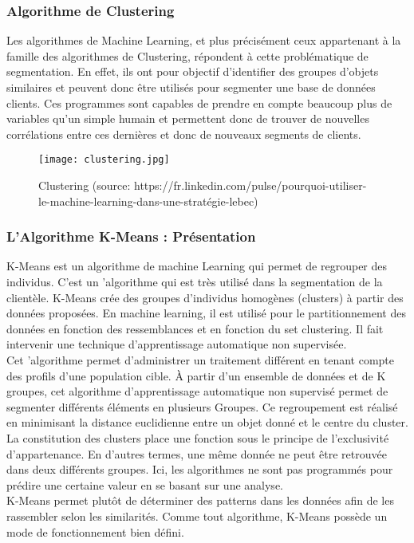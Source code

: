 \documentclass{article}
\begin{document}
\subsubsection{Algorithme de Clustering}
Les algorithmes de Machine Learning, et plus précisément ceux appartenant à la famille des algorithmes de Clustering, répondent à cette problématique de segmentation. En effet, ils ont pour objectif d’identifier des groupes d’objets similaires et peuvent donc être utilisés pour segmenter une base de données  clients. Ces programmes sont capables de prendre en compte beaucoup plus de variables qu’un simple humain et permettent donc de trouver de nouvelles corrélations entre ces dernières et donc de nouveaux segments de clients.
\begin{figure}[h]
   \centering
   \texttt{[image: clustering.jpg]}
   \caption{Clustering (source: https://fr.linkedin.com/pulse/pourquoi-utiliser-le-machine-learning-dans-une-stratégie-lebec)}
\end{figure}
\subsubsection{L’Algorithme K-Means : Présentation}
K-Means est un algorithme de machine Learning qui permet de regrouper des individus. C’est un ’algorithme qui est très utilisé dans la segmentation de la clientèle. K-Means crée des groupes d'individus homogènes (clusters) à partir des données proposées. En machine learning, il est utilisé pour le partitionnement des données en fonction des ressemblances et en fonction du set clustering. Il fait intervenir une technique d'apprentissage automatique non supervisée. \\
Cet 'algorithme permet d'administrer un traitement différent en tenant compte des profils d'une population cible. À partir d'un ensemble de données et de  K  groupes, cet algorithme d'apprentissage automatique non supervisé permet de segmenter différents éléments en plusieurs Groupes. Ce regroupement est réalisé en minimisant la distance euclidienne entre un objet donné et le centre du cluster. La constitution des clusters place une fonction sous le principe de l'exclusivité d'appartenance. En d'autres termes, une même donnée ne peut être retrouvée dans deux différents groupes. Ici, les algorithmes ne sont pas programmés pour prédire une certaine valeur en se basant sur une analyse. \\
K-Means permet plutôt de déterminer des patterns dans les données afin de les rassembler selon les similarités. Comme tout algorithme, K-Means possède un mode de fonctionnement bien défini.
\end{document}
